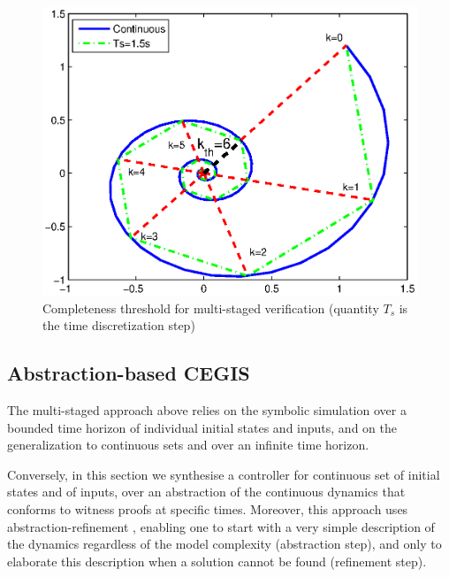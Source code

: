 \begin{figure}[t]
\centering
\includegraphics[width=\columnwidth]{figures/ct.eps}
\caption{Completeness threshold for multi-staged verification (quantity $T_s$ is the time discretization step) }
\label{fig:ct}
\end{figure}


\ifx\axelerator
\subsection{Abstraction-based CEGIS} 
\label{sssec:abstraction}


The multi-staged approach above relies on the symbolic simulation over a bounded time horizon of individual initial states and inputs, 
and on the generalization to continuous sets and over an infinite time horizon. 


Conversely, in this section we synthesise a controller for continuous set of initial states and of inputs, 
over an abstraction of the continuous dynamics \cite{cattaruzza2015unbounded} that conforms to witness proofs at specific times.   
Moreover, this approach uses abstraction-refinement \cite{DBLP:conf/cav/ClarkeGJLV00},  
enabling one to start with a very simple description of the dynamics regardless of the model complexity (abstraction step), 
and only to elaborate this description 
when a solution cannot be found (refinement step). 

